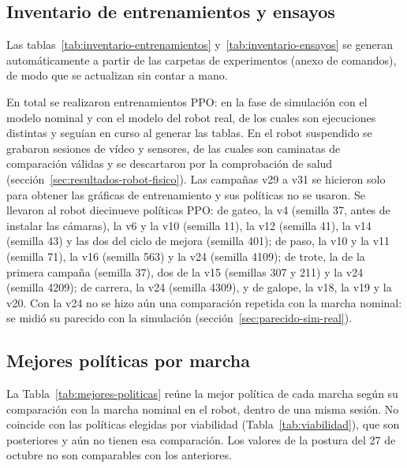 \subsection{Inventario de entrenamientos y ensayos}
\label{sec:inventario}

Las tablas~\ref{tab:inventario-entrenamientos} y~\ref{tab:inventario-ensayos}
se generan automáticamente a partir de las carpetas de experimentos
(anexo de comandos), de modo que se actualizan sin contar a mano.



En total se realizaron \InvTotal{} entrenamientos PPO: \InvSimulacion{} en la
fase de simulación con el modelo nominal y \InvReal{} con el modelo del robot
real, de los cuales \InvRealDistintas{} son ejecuciones distintas y
\InvEnCurso{} seguían en curso al generar las tablas. En el robot suspendido se
grabaron \InvGrabaciones{} sesiones de vídeo y sensores, de las cuales
\InvCaminatasValidas{} son caminatas de comparación válidas y
\InvCaminatasFallo{} se descartaron por la comprobación de salud
(sección~\ref{sec:resultados-robot-fisico}). Las campañas v29 a v31 se hicieron
solo para obtener las gráficas de entrenamiento y sus políticas no se usaron. Se
llevaron al robot diecinueve políticas PPO: de gateo, la v4 (semilla 37, antes de instalar las cámaras), la
v6 y la v10 (semilla 11), la v12 (semilla 41), la v14 (semilla 43) y las dos del
ciclo de mejora (semilla 401); de paso, la v10 y la v11 (semilla 71), la v16 (semilla 563) y la v24 (semilla
4109); de trote, la de la primera campaña (semilla 37), dos de la v15 (semillas 307
y 211) y la v24 (semilla 4209); de carrera, la v24 (semilla 4309), y de galope, la
v18, la v19 y la v20. Con la v24 no se hizo aún una comparación repetida con la
marcha nominal: se midió su parecido con la simulación
(sección~\ref{sec:parecido-sim-real}).

\subsection{Mejores políticas por marcha}

La Tabla~\ref{tab:mejores-politicas} reúne la mejor política de cada marcha
según su comparación con la marcha nominal en el robot, dentro de una misma sesión.
No coincide con las políticas elegidas por viabilidad
(Tabla~\ref{tab:viabilidad}), que son posteriores y aún no tienen esa comparación.
Los valores de la postura del 27 de octubre no son comparables con los anteriores.

